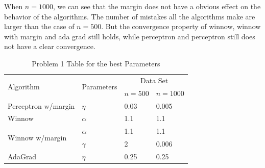 \noindent When $n=1000$, we can see that the margin does not have a obvious effect on the behavior of the algorithms. The number of mistakes all the algorithms make are larger than the case of $n=500$. But the convergence property of winnow, winnow with margin and ada grad still holds, while perceptron and perceptron still does not have a clear convergence. 
\begin{center}
	\begin{table}[!hbp]
		\begin{tabular}{|p{4.3cm}<{\centering}|p{2.5cm}<{\centering}|p{4cm}<{\centering}|p{4cm}<{\centering}|}
			\hline
			\multirow{2}{*}{Algorithm} & \multirow{2}{*}{Parameters} & \multicolumn{2}{|c|}{Data Set} \\
			\cline{3-4}
			& & $n=500$& $n=1000$\\
			\hline
			Perceptron w/margin &          $\eta$          &     0.03              &               0.005                \\ \hline
			Winnow               &     $\alpha$           &         1.1            &         1.1                          \\\hline %
			\multirow{2}{*}{Winnow w/margin}     & $\alpha$&      1.1                           &             1.1        \\
			\cline{2-4}
			& $\gamma$ & 2 & 0.006 \\ \hline %
			AdaGrad             & $\eta$&              0.25                        &             0.25                      \\\hline %
		\end{tabular}
			\caption{Problem 1 Table for the best Parameters}
	\end{table}
\end{center}

